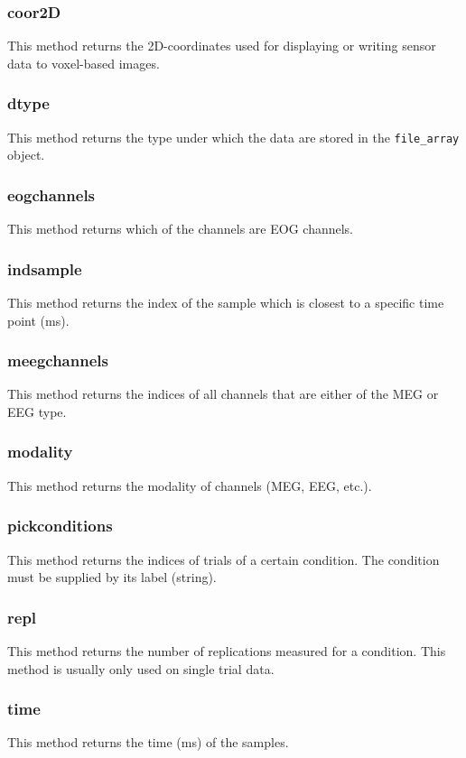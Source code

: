 \subsubsection{coor2D}
This method returns the 2D-coordinates used for displaying or writing sensor data to voxel-based images.

\subsubsection{dtype}
This method returns the type under which the data are stored in the \texttt{file\_array} object.

\subsubsection{eogchannels}
This method returns which of the channels are EOG channels.

\subsubsection{indsample}
This method returns the index of the sample which is closest to a specific time point (ms).

\subsubsection{meegchannels}
This method returns the indices of all channels that are either of the MEG or EEG type.

\subsubsection{modality}
This method returns the modality of channels (MEG, EEG, etc.).

\subsubsection{pickconditions}
This method returns the indices of trials of a certain condition. The condition must be supplied by its label (string).

\subsubsection{repl}
This method returns the number of replications measured for a condition. This method is usually only used on single trial data.

\subsubsection{time}
This method returns the time (ms) of the samples.

